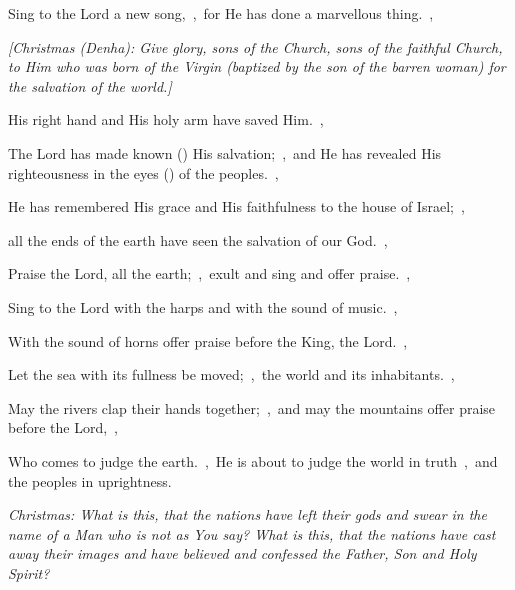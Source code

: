 \documentclass[12pt,twoside,a5paper]{article}
\begin{document}
\begin{normalparskip}
  Sing to the Lord a new song,~\sep\ for He has done a marvellous thing.~\sep


  \emph{[Christmas (Denha): Give glory, sons of the Church, sons of the faithful Church, to Him who was born of the Virgin (baptized by the son of the barren woman) for the salvation of the world.]}

  His right hand and His holy arm have saved Him.~\sep

  The Lord has made known () His salvation;~\sep\ and He has revealed His righteousness in the eyes () of the peoples.~\sep

  He has remembered His grace and His faithfulness to the house of Israel;~\sep

  all the ends of the earth have seen the salvation of our God.~\sep

  Praise the Lord, all the earth;~\sep\ exult and sing and offer praise.~\sep

  Sing to the Lord with the harps and with the sound of music.~\sep

  With the sound of horns offer praise before the King, the Lord.~\sep

  Let the sea with its fullness be moved;~\sep\ the world and its inhabitants.~\sep

  May the rivers clap their hands together;~\sep\ and may the mountains offer praise before the Lord,~\sep

  Who comes to judge the earth.~\sep\ He is about to judge the world in truth~\sep\ and the peoples in uprightness.

  \emph{Christmas: What is this, that the nations have left their gods and swear in the name of a Man who is not as You say? What is this, that the nations have cast away their images and have believed and confessed the Father, Son and Holy Spirit?}
\end{normalparskip}


\end{document}
